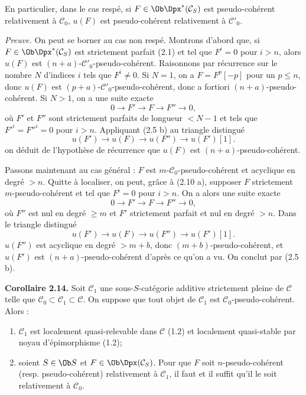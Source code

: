 \documentclass[11pt]{article}
\begin{document}
En particulier, dans le cas respé, si \(F\in\Ob\Dpx^*(\mathcal C_S)\) est pseudo-cohérent relativement à \(\mathcal C_0\), \(u(F)\) est pseudo-cohérent relativement à \(\mathcal C'_0\).

\emph{Preuve.} On peut se borner au cas non respé. Montrons d'abord que, si \(F\in\Ob\Dpx^*(\mathcal C_S)\) est strictement parfait (2.1) et tel que \(F^i=0\) pour \(i>n\), alors \(u(F)\) est \((n+a)\)-\(\mathcal C'_0\)-pseudo-cohérent. Raisonnons par récurrence sur le nombre \(N\) d'indices \(i\) tels que \(F^i\neq0\). Si \(N=1\), on a \(F=F^p[-p]\) pour un \(p\leq n\), donc \(u(F)\) est \((p+a)\)-\(\mathcal C'_0\)-pseudo-cohérent, donc a fortiori \((n+a)\)-pseudo-cohérent. Si \(N>1\), on a une suite exacte
\[
  0\longrightarrow F'\longrightarrow F\longrightarrow F''\longrightarrow 0,
\]
où \(F'\) et \(F''\) sont strictement parfaits de longueur \(<N-1\) et tels que \(F'^i=F''^i=0\) pour \(i>n\). Appliquant (2.5 b) au triangle distingué
\[
  u(F')\longrightarrow u(F)\longrightarrow u(F'')\longrightarrow u(F')[1].
\]
on déduit de l'hypothèse de récurrence que \(u(F)\) est \((n+a)\)-pseudo-cohérent.

Passons maintenant au cas général : \(F\) est \(m\)-\(\mathcal C_0\)-pseudo-cohérent et acyclique en degré \(>n\). Quitte à localiser, on peut, grâce à (2.10 a), supposer \(F\) strictement \(m\)-pseudo-cohérent et tel que \(F^i=0\) pour \(i>n\). On a alors une suite exacte
\[
  0\longrightarrow F'\longrightarrow F\longrightarrow F''\longrightarrow 0,
\]
où \(F''\) est nul en degré \(\geq m\) et \(F'\) strictement parfait et nul en degré \(>n\). Dans le triangle distingué
\[
  u(F')\longrightarrow u(F)\longrightarrow u(F'')\longrightarrow u(F')[1].
\]
\(u(F'')\) est acyclique en degré \(>m+b\), donc \((m+b)\)-pseudo-cohérent, et \(u(F')\) est \((n+a)\)-pseudo-cohérent d'après ce qu'on a vu. On conclut par (2.5 b).

\textbf{Corollaire 2.14.} Soit \(\mathcal C_1\) une sous-\(S\)-catégorie additive strictement pleine de \(\mathcal C\) telle que \(\mathcal C_0\subset\mathcal C_1\subset\mathcal C\). On suppose que tout objet de \(\mathcal C_1\) est \(\mathcal C_0\)-pseudo-cohérent. Alors :
\begin{enumerate}[label=(\roman*)]
\item \(\mathcal C_1\) est localement quasi-relevable dans \(\mathcal C\) (1.2) et localement quasi-stable par noyau d'épimorphisme (1.2);
\item soient \(S\in\Ob S\) et \(F\in\Ob\Dpx(\mathcal C_S)\). Pour que \(F\) soit \(n\)-pseudo-cohérent (resp. pseudo-cohérent) relativement à \(\mathcal C_1\), il faut et il suffit qu'il le soit relativement à \(\mathcal C_0\).
\end{enumerate}
\end{document}
